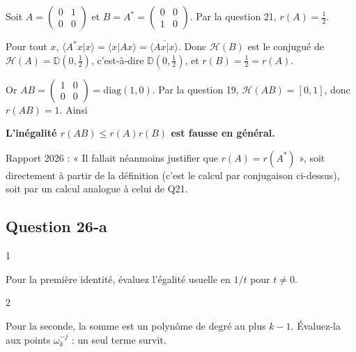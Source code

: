 \documentclass[11pt,a4paper]{article}
\newcommand{\equationajustee}[1]{%
  \sbox{\boiteequation}{$\displaystyle #1$}%
  \ifdim\wd\boiteequation>\linewidth
    \[\resizebox{\linewidth}{!}{\usebox{\boiteequation}}\]%
  \else
    \[#1\]%
  \fi}
\begin{document}
Soit \(A=\begin{pmatrix}0&1\\0&0\end{pmatrix}\) et \(B=A^*=\begin{pmatrix}0&0\\1&0\end{pmatrix}\). Par la question 21, \(r(A)=\frac12\).

Pour tout \(x\), \(\langle A^*x|x\rangle=\langle x|Ax\rangle=\overline{\langle Ax|x\rangle}\). Donc \(\mathcal H(B)\) est le conjugué de \(\mathcal H(A)=\mathbb D(0,\frac12)\), c'est-à-dire \(\mathbb D(0,\frac12)\), et \(r(B)=\frac12=r(A)\).

Or \(AB=\begin{pmatrix}1&0\\0&0\end{pmatrix}=\mathrm{diag}(1,0)\). Par la question 19, \(\mathcal H(AB)=[0,1]\), donc \(r(AB)=1\). Ainsi

\equationajustee{r(AB)=1>\tfrac14=r(A)\,r(B).}

\textbf{L'inégalité \(r(AB)\le r(A)r(B)\) est fausse en général.}

\begin{jury}

Rapport 2026 : « Il fallait néanmoins justifier que \(r(A) = r(A^*)\) », soit directement à partir de la définition (c'est le calcul par conjugaison ci-dessus), soit par un calcul analogue à celui de Q21.

\end{jury}

\hypertarget{question-26-a}{%
\subsection{Question 26-a}\label{question-26-a}}

\begin{indication}{1}

Pour la première identité, évaluez l'égalité usuelle en \(1/t\) pour \(t\neq0\).

\end{indication}

\begin{indication}{2}

Pour la seconde, la somme est un polynôme de degré au plus \(k-1\). Évaluez-la aux points \(\omega_k^{-j}\) : un seul terme survit.

\end{indication}
\end{document}
